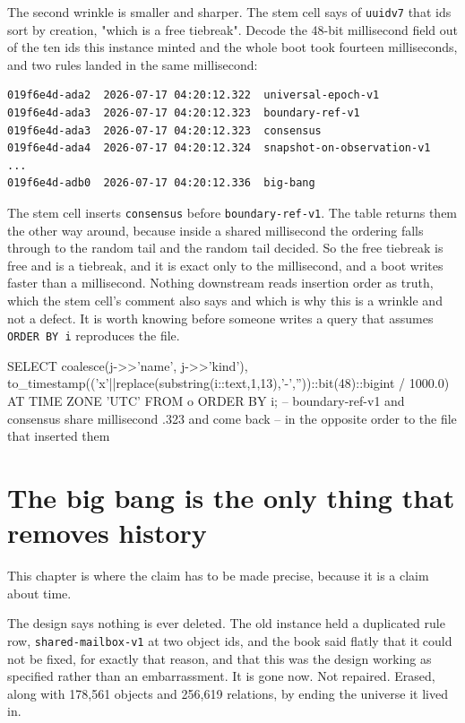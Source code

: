 The second wrinkle is smaller and sharper. The stem cell says of \texttt{uuidv7} that ids sort by creation, "which is a free tiebreak". Decode the 48-bit millisecond field out of the ten ids this instance minted and the whole boot took fourteen milliseconds, and two rules landed in the same millisecond:

\begin{verbatim}
019f6e4d-ada2  2026-07-17 04:20:12.322  universal-epoch-v1
019f6e4d-ada3  2026-07-17 04:20:12.323  boundary-ref-v1
019f6e4d-ada3  2026-07-17 04:20:12.323  consensus
019f6e4d-ada4  2026-07-17 04:20:12.324  snapshot-on-observation-v1
...
019f6e4d-adb0  2026-07-17 04:20:12.336  big-bang
\end{verbatim}

The stem cell inserts \texttt{consensus} before \texttt{boundary-ref-v1}. The table returns them the other way around, because inside a shared millisecond the ordering falls through to the random tail and the random tail decided. So the free tiebreak is free and is a tiebreak, and it is exact only to the millisecond, and a boot writes faster than a millisecond. Nothing downstream reads insertion order as truth, which the stem cell's comment also says and which is why this is a wrinkle and not a defect. It is worth knowing before someone writes a query that assumes \texttt{ORDER BY i} reproduces the file.

\begin{Check}
SELECT coalesce(j->>'name', j->>'kind'),
       to_timestamp(('x'||replace(substring(i::text,1,13),'-',''))::bit(48)::bigint
                    / 1000.0) AT TIME ZONE 'UTC'
  FROM o ORDER BY i;
-- boundary-ref-v1 and consensus share millisecond .323 and come back
-- in the opposite order to the file that inserted them
\end{Check}

\section{The big bang is the only thing that removes history}

This chapter is where the claim has to be made precise, because it is a claim about time.

The design says nothing is ever deleted. The old instance held a duplicated rule row, \texttt{shared-mailbox-v1} at two object ids, and the book said flatly that it could not be fixed, for exactly that reason, and that this was the design working as specified rather than an embarrassment. It is gone now. Not repaired. Erased, along with 178{,}561 objects and 256{,}619 relations, by ending the universe it lived in.

